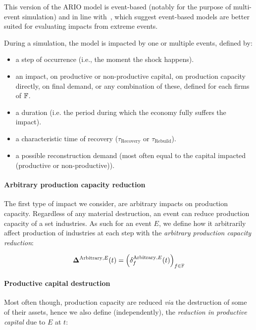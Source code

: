 This version of the ARIO model is event-based (notably for the
purpose of multi-event simulation) and in line
with~\textcite{otto-2020-event-based}, which suggest event-based models are
better suited for evaluating impacts from extreme events.

During a simulation, the model is impacted by one or multiple events, defined by:
\begin{itemize}
\item a step of occurrence (i.e., the moment the shock happens).
\item an impact, on productive or non-productive capital, on production capacity
  directly, on final demand, or any combination of these, defined for each firms of $\mathbb{F}$.
\item a duration (i.e. the period during which the economy fully suffers the
  impact).
\item a characteristic time of recovery ($\tau_{\textrm{Recovery}}$ or $\tau_{\textrm{Rebuild}}$).
\item a possible reconstruction demand (most often equal to the capital impacted
  (productive or non-productive)).
\end{itemize}


\paragraph{Arbitrary production capacity reduction}
\label{sec:arbitr-prod-capac}

The first type of impact we consider, are arbitrary impacts on production
capacity. Regardless of any material destruction, an event can reduce production
capacity of a set industries. As such for an event $E$, we define how it
arbitrarily affect production of industries at each step with the
\emph{arbitrary production capacity reduction}:

\[
  \bm{\Delta}^{\textrm{Arbitrary},E}(t) = \left (
    \delta^{\textrm{Arbitrary},E}_f(t) \right )_{f \in \mathbb{F}}
\]

\paragraph{Productive capital destruction}
\label{sec:prod-capit-destr}

Most often though, production capacity are reduced \emph{via} the destruction of some
of their assets, hence we also define (independently), the \emph{reduction in productive
  capital} due to $E$ at $t$:


